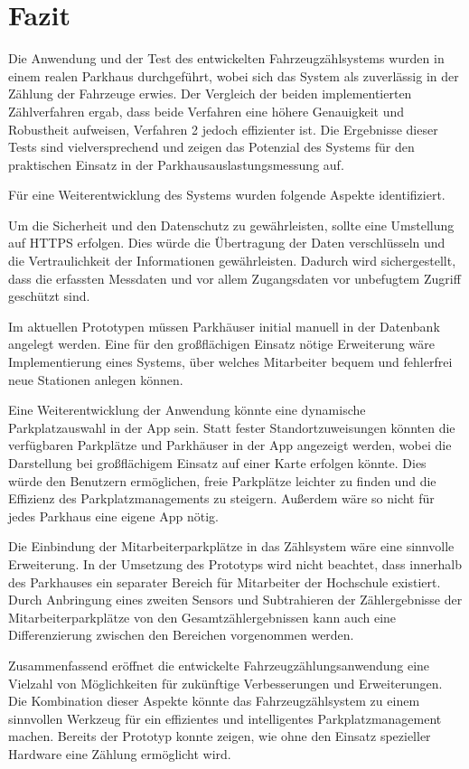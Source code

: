 \section{Fazit}\label{ch:Fazit}

Die Anwendung und der Test des entwickelten Fahrzeugzählsystems wurden in einem realen Parkhaus durchgeführt, wobei sich das System als zuverlässig in der Zählung der Fahrzeuge erwies.
Der Vergleich der beiden implementierten Zählverfahren ergab, dass beide Verfahren eine höhere Genauigkeit und Robustheit aufweisen, Verfahren 2 jedoch effizienter ist.
Die Ergebnisse dieser Tests sind vielversprechend und zeigen das Potenzial des Systems für den praktischen Einsatz in der Parkhausauslastungsmessung auf.

Für eine Weiterentwicklung des Systems wurden folgende Aspekte identifiziert.

Um die Sicherheit und den Datenschutz zu gewährleisten, sollte eine Umstellung auf HTTPS erfolgen.
Dies würde die Übertragung der Daten verschlüsseln und die Vertraulichkeit der Informationen gewährleisten.
Dadurch wird sichergestellt, dass die erfassten Messdaten und vor allem Zugangsdaten vor unbefugtem Zugriff geschützt sind.

Im aktuellen Prototypen müssen Parkhäuser initial manuell in der Datenbank angelegt werden.
Eine für den großflächigen Einsatz nötige Erweiterung wäre Implementierung eines Systems, über welches Mitarbeiter bequem und fehlerfrei neue Stationen anlegen können.

Eine Weiterentwicklung der Anwendung könnte eine dynamische Parkplatzauswahl in der App sein.
Statt fester Standortzuweisungen könnten die verfügbaren Parkplätze und Parkhäuser in der App angezeigt werden, wobei die Darstellung bei großflächigem Einsatz auf einer Karte erfolgen könnte.
Dies würde den Benutzern ermöglichen, freie Parkplätze leichter zu finden und die Effizienz des Parkplatzmanagements zu steigern.
Außerdem wäre so nicht für jedes Parkhaus eine eigene App nötig.

Die Einbindung der Mitarbeiterparkplätze in das Zählsystem wäre eine sinnvolle Erweiterung.
In der Umsetzung des Prototyps wird nicht beachtet, dass innerhalb des Parkhauses ein separater Bereich für Mitarbeiter der Hochschule existiert.
Durch Anbringung eines zweiten Sensors und Subtrahieren der Zählergebnisse der Mitarbeiterparkplätze von den Gesamtzählergebnissen kann auch eine Differenzierung zwischen den Bereichen vorgenommen werden.

Zusammenfassend eröffnet die entwickelte Fahrzeugzählungsanwendung eine Vielzahl von Möglichkeiten für zukünftige Verbesserungen und Erweiterungen.
Die Kombination dieser Aspekte könnte das Fahrzeugzählsystem zu einem sinnvollen Werkzeug für ein effizientes und intelligentes Parkplatzmanagement machen.
Bereits der Prototyp konnte zeigen, wie ohne den Einsatz spezieller Hardware eine Zählung ermöglicht wird.
